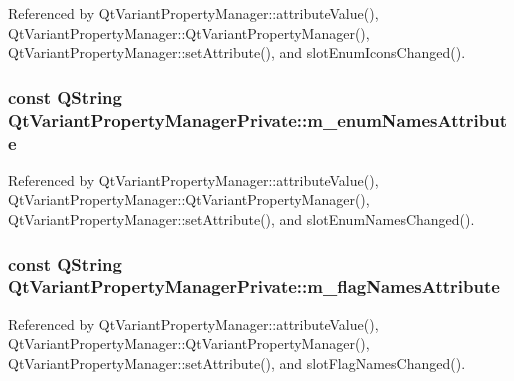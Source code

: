 Referenced by Qt\+Variant\+Property\+Manager\+::attribute\+Value(), Qt\+Variant\+Property\+Manager\+::\+Qt\+Variant\+Property\+Manager(), Qt\+Variant\+Property\+Manager\+::set\+Attribute(), and slot\+Enum\+Icons\+Changed().

\subsubsection[{m\+\_\+enum\+Names\+Attribute}]{\setlength{\rightskip}{0pt plus 5cm}const Q\+String Qt\+Variant\+Property\+Manager\+Private\+::m\+\_\+enum\+Names\+Attribute}\label{classQtVariantPropertyManagerPrivate_a18a937a3d34da6abbc9a16a794898044}


Referenced by Qt\+Variant\+Property\+Manager\+::attribute\+Value(), Qt\+Variant\+Property\+Manager\+::\+Qt\+Variant\+Property\+Manager(), Qt\+Variant\+Property\+Manager\+::set\+Attribute(), and slot\+Enum\+Names\+Changed().

\subsubsection[{m\+\_\+flag\+Names\+Attribute}]{\setlength{\rightskip}{0pt plus 5cm}const Q\+String Qt\+Variant\+Property\+Manager\+Private\+::m\+\_\+flag\+Names\+Attribute}\label{classQtVariantPropertyManagerPrivate_ac2c271dc0a746dd63a7973cd22630841}


Referenced by Qt\+Variant\+Property\+Manager\+::attribute\+Value(), Qt\+Variant\+Property\+Manager\+::\+Qt\+Variant\+Property\+Manager(), Qt\+Variant\+Property\+Manager\+::set\+Attribute(), and slot\+Flag\+Names\+Changed().

